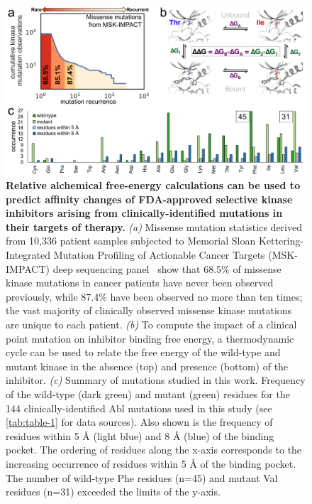 \documentclass[phd,tocprelim]{cornell}
\renewcommand{\TABLE}[1]{\autoref{tab:#1}}
\begin{document}
\begin{landscape}
\begin{figure}[p]
\centering
\includegraphics[width=0.90\linewidth]{figures/abl-figure-1.pdf}
\caption[Relative alchemical free-energy calculations can be used to predict affinity changes of FDA-approved selective kinase inhibitors arising from clinically-identified mutations in their targets of therapy.]{
{\bf Relative alchemical free-energy calculations can be used to predict affinity changes of FDA-approved selective kinase inhibitors arising from clinically-identified mutations in their targets of therapy.}
\emph{(a)}
Missense mutation statistics derived from 10,336 patient samples subjected to Memorial Sloan
Kettering-Integrated Mutation Profiling of Actionable Cancer Targets (MSK-IMPACT) deep sequencing panel~\citep{Zehir:Nat.Med.:2017} show that 68.5\% of missense kinase mutations in cancer patients have never been observed previously, while 87.4\% have been observed no more than ten times; the vast majority of clinically observed missense kinase mutations are unique to each patient.
\emph{(b)} To compute the impact of a clinical point mutation on inhibitor binding free energy, a thermodynamic cycle can be used to relate the free energy of the wild-type and mutant kinase in the absence (top) and presence (bottom) of the inhibitor.
\emph{(c)} Summary of mutations studied in this work. 
Frequency of the wild-type (dark green) and mutant (green) residues for the 144 clinically-identified Abl mutations used in this study (see \TABLE{table-1} for data sources). 
Also shown is the frequency of residues within 5 {\AA} (light blue) and 8 {\AA} (blue) of the binding pocket. 
The ordering of residues along the x-axis corresponds to the increasing occurrence of residues within 5 {\AA} of the binding pocket.
The number of wild-type Phe residues (n=45) and mutant Val residues (n=31) exceeded the limits of the y-axis.
}
\label{fig:abl-figure-1}
\end{figure}
\end{landscape}
\end{document}
